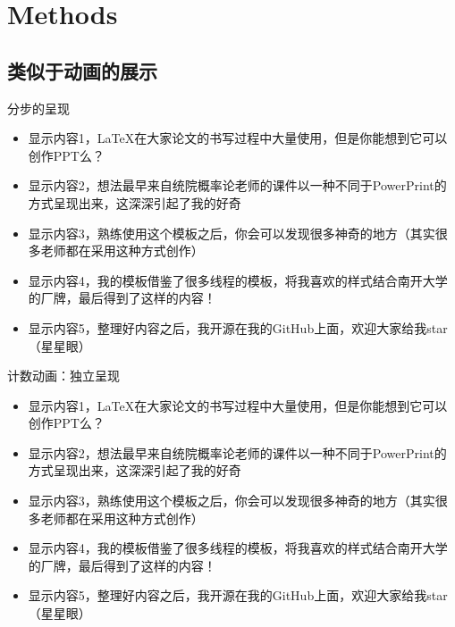 \documentclass{beamer}
\begin{document}
\section{Methods}
\subsection{类似于动画的展示}
\begin{frame}{分步的呈现}
   \begin{itemize}
\item<1->显示内容1，\LaTeX{}在大家论文的书写过程中大量使用，但是你能想到它可以创作PPT么？

\item<2->显示内容2，想法最早来自统院概率论老师的课件以一种不同于PowerPrint的方式呈现出来，这深深引起了我的好奇

\item<3->显示内容3，熟练使用这个模板之后，你会可以发现很多神奇的地方（其实很多老师都在采用这种方式创作）

\item<4->显示内容4，我的模板借鉴了很多线程的模板，将我喜欢的样式结合南开大学的厂牌，最后得到了这样的内容！

\item<5->显示内容5，整理好内容之后，我开源在我的GitHub上面，欢迎大家给我star（星星眼）

\end{itemize}
\end{frame}

\begin{frame}{计数动画：独立呈现}
   \begin{itemize}
\item<1>显示内容1，\LaTeX{}在大家论文的书写过程中大量使用，但是你能想到它可以创作PPT么？

\item<2>显示内容2，想法最早来自统院概率论老师的课件以一种不同于PowerPrint的方式呈现出来，这深深引起了我的好奇

\item<3>显示内容3，熟练使用这个模板之后，你会可以发现很多神奇的地方（其实很多老师都在采用这种方式创作）

\item<4>显示内容4，我的模板借鉴了很多线程的模板，将我喜欢的样式结合南开大学的厂牌，最后得到了这样的内容！

\item<5>显示内容5，整理好内容之后，我开源在我的GitHub上面，欢迎大家给我star（星星眼）

\end{itemize}
\end{frame}
\end{document}
